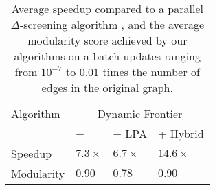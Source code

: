 \begin{table}
\setlength{\tabcolsep}{1pt}
\centering
\begin{tabular}{|l|l|l|l|} 
\hline
Algorithm & \multicolumn{3}{|c|}{Dynamic Frontier} \\
\cline{2-4}
 & + \Lou{} & + LPA & + Hybrid \\ \hline
Speedup & $7.3\times$ & $6.7\times$ & $14.6\times$ \\ \hline
Modularity & $0.90$ & $0.78$ & $0.90$ \\ \hline
\end{tabular}
\caption{Average speedup compared to a parallel $\Delta$-screening algorithm \cite{com-zarayeneh21}, and the average modularity score achieved by our algorithms on a batch updates ranging from $10^{-7}$ to $0.01$ times the number of edges in the original graph.}
\label{tab:results}
\end{table}
